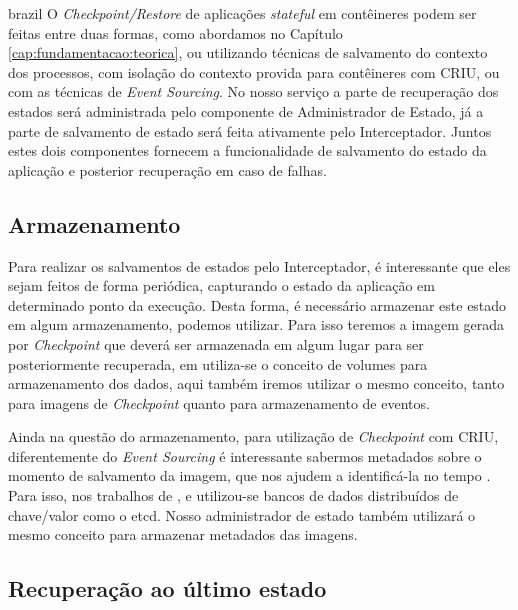 \begin{otherlanguage*}{brazil}
O \textit{Checkpoint/Restore} de aplicações \textit{stateful} em contêineres podem ser
feitas entre duas formas, como abordamos no Capítulo \ref{cap:fundamentacao:teorica}, ou
utilizando técnicas de salvamento do contexto dos processos, com isolação do contexto
provida para contêineres \cite{muller2022architecture} com CRIU, ou com as técnicas de
\textit{Event Sourcing}. No nosso serviço a parte de recuperação dos estados será
administrada pelo componente de Administrador de Estado, já a parte de salvamento de estado
será feita ativamente pelo Interceptador. Juntos estes dois componentes fornecem a
funcionalidade de salvamento do estado da aplicação e posterior recuperação em caso
de falhas.

\subsection{Armazenamento}

Para realizar os salvamentos de estados pelo Interceptador, é interessante que eles sejam
feitos de forma periódica, capturando o estado da aplicação em determinado ponto da execução.
Desta forma, é necessário armazenar este estado em algum armazenamento, podemos utilizar. Para
isso teremos a imagem gerada por \textit{Checkpoint} que deverá ser armazenada em algum lugar
para ser posteriormente recuperada, em \cite{vayghan2021kubernetes} utiliza-se o conceito de
volumes para armazenamento dos dados, aqui também iremos utilizar o mesmo conceito, tanto para
imagens de \textit{Checkpoint} quanto para armazenamento de eventos.

Ainda na questão do armazenamento, para utilização de \textit{Checkpoint} com CRIU,
diferentemente do \textit{Event Sourcing} é interessante sabermos metadados sobre o momento
de salvamento da imagem, que nos ajudem a identificá-la no tempo \cite{oh2018stateful}
\cite{muller2022architecture} \cite{Chen2015/10}. Para isso, nos trabalhos de
\cite{muller2022architecture}, \cite{oh2018stateful} e \cite{Chen2015/10} utilizou-se
bancos de dados distribuídos de chave/valor como o etcd. Nosso administrador de estado também
utilizará o mesmo conceito para armazenar metadados das imagens.

\subsection{Recuperação ao último estado}


\end{otherlanguage*}

